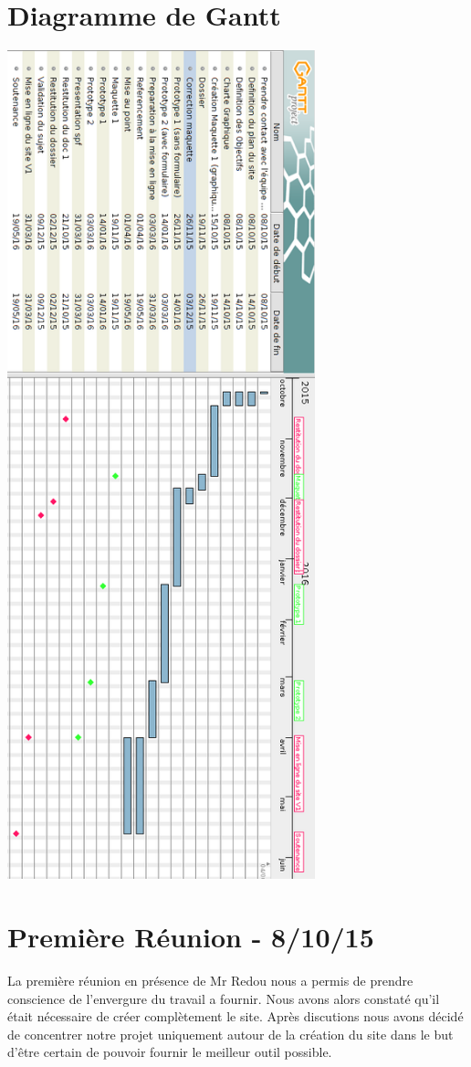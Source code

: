 \documentclass[a4paper, 12pt]{report}
\begin{document}
\section{Diagramme de Gantt}
\begin{center}
\includegraphics[height=24cm]{gantt.png}
\end{center}
\newpage
\section{Première Réunion - 8/10/15}
La première réunion en présence de Mr Redou nous a permis de prendre conscience de l'envergure du travail a fournir. Nous avons alors constaté qu'il était nécessaire de créer complètement le site. Après discutions nous avons décidé de concentrer notre projet uniquement autour de la création du site dans le but d’être certain de pouvoir fournir le meilleur outil possible.
\end{document}
